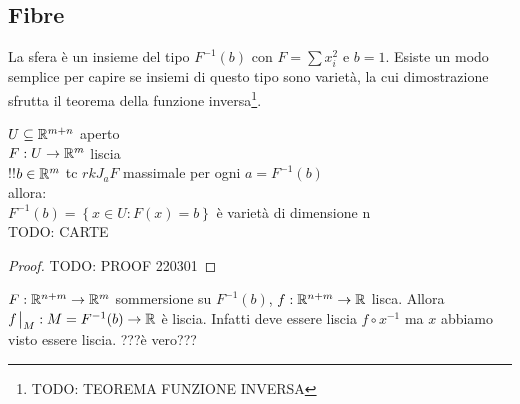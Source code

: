 \subsection{Fibre}
La sfera è un insieme del tipo $F^{-1}(b)$ con $F=\sum x_i^2$ e
$b=1$. Esiste un modo semplice per capire se insiemi di questo tipo
sono varietà, la cui dimostrazione sfrutta il teorema della
funzione inversa\footnote{TODO: TEOREMA FUNZIONE INVERSA}.
\begin{theorem}
    $U\subseteq\mathbb{R}^{m+n}$ aperto\\
    $F:U\rightarrow \mathbb{R}^m$ liscia\\
    !!$b\in\mathbb{R}^m$ tc $rkJ_aF$ massimale per ogni $a=F^{-1}(b)$\\
    allora:\\
    $F^{-1}(b)=\left\{ x\in U: F(x)=b \right\}$ è varietà di
    dimensione n\\
TODO: CARTE
\end{theorem}
\begin{proof}
    TODO: PROOF 220301
\end{proof}

\begin{obs}
    $F:\mathbb{R}^{n+m}\rightarrow\mathbb{R}^m$ sommersione su $F^{-1}(b)$,
    $f:\mathbb{R}^{n+m}\rightarrow \mathbb{R}$ lisca. Allora
    $f\eval_{M}:M=F^{-1}(b)\rightarrow\R$ è liscia. Infatti deve
    essere liscia $f\circ x^{-1}$ ma $x$ abbiamo visto essere
    liscia. ???è vero???
\end{obs}

